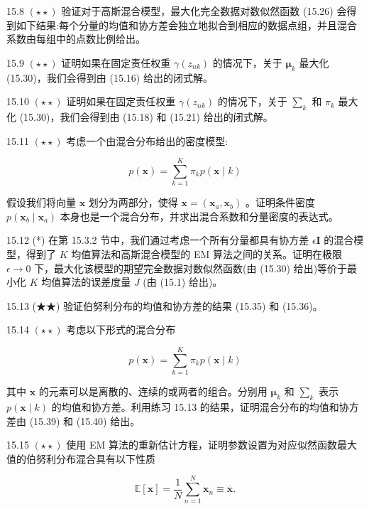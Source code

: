 \documentclass[10pt]{report}
\begin{document}
15.8 \(\left( {\star  \star  }\right)\) 验证对于高斯混合模型，最大化完全数据对数似然函数 (15.26) 会得到如下结果:每个分量的均值和协方差会独立地拟合到相应的数据点组，并且混合系数由每组中的点数比例给出。

15.9 \(\left( {\star  \star  }\right)\) 证明如果在固定责任权重 \(\gamma \left( {z}_{nk}\right)\) 的情况下，关于 \({\mathbf{\mu }}_{k}\) 最大化 (15.30)，我们会得到由 (15.16) 给出的闭式解。

15.10 \(\left( {\star  \star  }\right)\) 证明如果在固定责任权重 \(\gamma \left( {z}_{nk}\right)\) 的情况下，关于 \({\mathbf{\sum }}_{k}\) 和 \({\pi }_{k}\) 最大化 (15.30)，我们会得到由 (15.18) 和 (15.21) 给出的闭式解。

15.11 \(\left( {\star  \star  }\right)\) 考虑一个由混合分布给出的密度模型:

\[
p\left( \mathbf{x}\right)  = \mathop{\sum }\limits_{{k = 1}}^{K}{\pi }_{k}p\left( {\mathbf{x} \mid  k}\right)  \tag{15.63}
\]

假设我们将向量 \(\mathbf{x}\) 划分为两部分，使得 \(\mathbf{x} = \left( {{\mathbf{x}}_{a},{\mathbf{x}}_{b}}\right)\) 。证明条件密度 \(p\left( {{\mathbf{x}}_{b} \mid  {\mathbf{x}}_{a}}\right)\) 本身也是一个混合分布，并求出混合系数和分量密度的表达式。

15.12 (*) 在第 15.3.2 节中，我们通过考虑一个所有分量都具有协方差 \(\epsilon \mathbf{I}\) 的混合模型，得到了 \(K\) 均值算法和高斯混合模型的 EM 算法之间的关系。证明在极限 \(\epsilon  \rightarrow  0\) 下，最大化该模型的期望完全数据对数似然函数(由 (15.30) 给出)等价于最小化 \(K\) 均值算法的误差度量 \(J\) (由 (15.1) 给出)。

15.13 (★★) 验证伯努利分布的均值和协方差的结果 (15.35) 和 (15.36)。

15.14 \(\left( {\star  \star  }\right)\) 考虑以下形式的混合分布

\[
p\left( \mathbf{x}\right)  = \mathop{\sum }\limits_{{k = 1}}^{K}{\pi }_{k}p\left( {\mathbf{x} \mid  k}\right)  \tag{15.64}
\]

其中 \(\mathbf{x}\) 的元素可以是离散的、连续的或两者的组合。分别用 \({\mathbf{\mu }}_{k}\) 和 \({\mathbf{\sum }}_{k}\) 表示 \(p\left( {\mathbf{x} \mid  k}\right)\) 的均值和协方差。利用练习 15.13 的结果，证明混合分布的均值和协方差由 (15.39) 和 (15.40) 给出。

15.15 \(\left( {\star  \star  }\right)\) 使用 EM 算法的重新估计方程，证明参数设置为对应似然函数最大值的伯努利分布混合具有以下性质

\[
\mathbb{E}\left\lbrack  \mathbf{x}\right\rbrack   = \frac{1}{N}\mathop{\sum }\limits_{{n = 1}}^{N}{\mathbf{x}}_{n} \equiv  \overline{\mathbf{x}}. \tag{15.65}
\]
\end{document}
